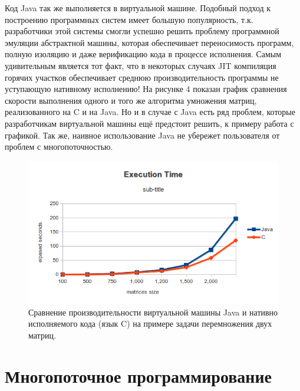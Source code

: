 \documentclass[a4paper, 12pt]{article} %
\begin{document}
Код Java так же выполняется в виртуальной машине. Подобный подход к построению программных систем имеет большую популярность, т.к. разработчики этой системы смогли успешно решить проблему программной эмуляции абстрактной машины, которая обеспечивает переносимость программ, полную изоляцию и даже верификацию кода в процессе исполнения. Самым удивительным является тот факт, что в некоторых случаях JIT компиляция горячих участков обеспечивает среднюю производительность программы не уступающую нативному исполнению! На рисунке 4 показан график сравнения скорости выполнения одного и того же алгоритма умножения матриц, реализованного на C и на Java. Но и в случае с Java есть ряд проблем, которые разработчикам виртуальной машины ещё предстоит решить, к примеру работа с графикой. Так же, наивное использование Java не убережет пользователя от проблем с многопоточностью.

\begin{figure}[h!]
\centering
\includegraphics[scale=0.9]{res/pic004}
\caption{Сравнение производительности виртуальной машины Java и нативно исполняемого кода (язык C) на примере задачи перемножения двух матриц.}
\end{figure}


\section*{Многопоточное программирование}
\end{document}

